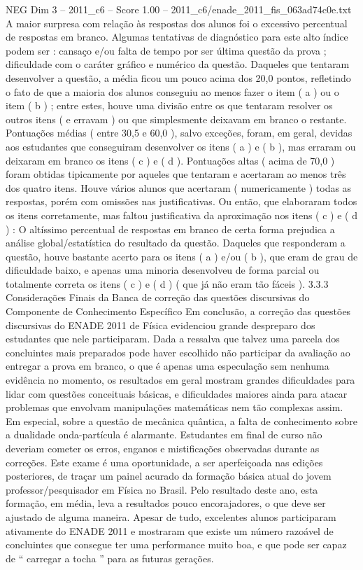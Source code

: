 \begin{textsample}{NEG Dim 3 – 2011\_c6 – Score 1.00 – 2011\_c6/enade\_2011\_fis\_063ad74c0e.txt}
A maior surpresa com relação às respostas dos alunos foi o excessivo percentual de respostas em branco.
Algumas tentativas de diagnóstico para este alto índice podem ser : cansaço e/ou falta de tempo por ser última questão da prova ; dificuldade com o caráter gráfico e numérico da questão.
Daqueles que tentaram desenvolver a questão, a média ficou um pouco acima dos 20,0 pontos, refletindo o fato de que a maioria dos alunos conseguiu ao menos fazer o item ( a ) ou o item ( b ) ; entre estes, houve uma divisão entre os que tentaram resolver os outros itens ( e erravam ) ou que simplesmente deixavam em branco o restante.
Pontuações médias ( entre 30,5 e 60,0 ), salvo exceções, foram, em geral, devidas aos estudantes que conseguiram desenvolver os itens ( a ) e ( b ), mas erraram ou deixaram em branco os itens ( c ) e ( d ).
Pontuações altas ( acima de 70,0 ) foram obtidas tipicamente por aqueles que tentaram e acertaram ao menos três dos quatro itens.
Houve vários alunos que acertaram ( numericamente ) todas as respostas, porém com omissões nas justificativas.
Ou então, que elaboraram todos os itens corretamente, mas faltou justificativa da aproximação nos itens ( c ) e ( d ) : O altíssimo percentual de respostas em branco de certa forma prejudica a análise global/estatística do resultado da questão.
Daqueles que responderam a questão, houve bastante acerto para os itens ( a ) e/ou ( b ), que eram de grau de dificuldade baixo, e apenas uma minoria desenvolveu de forma parcial ou totalmente correta os itens ( c ) e ( d ) ( que já não eram tão fáceis ). 3.3.3 Considerações Finais da Banca de correção das questões discursivas do Componente de Conhecimento Específico Em conclusão, a correção das questões discursivas do ENADE 2011 de Física evidenciou grande despreparo dos estudantes que nele participaram.
Dada a ressalva que talvez uma parcela dos concluintes mais preparados pode haver escolhido não participar da avaliação ao entregar a prova em branco, o que é apenas uma especulação sem nenhuma evidência no momento, os resultados em geral mostram grandes dificuldades para lidar com questões conceituais básicas, e dificuldades maiores ainda para atacar problemas que envolvam manipulações matemáticas nem tão complexas assim.
Em especial, sobre a questão de mecânica quântica, a falta de conhecimento sobre a dualidade onda-partícula é alarmante.
Estudantes em final de curso não deveriam cometer os erros, enganos e mistificações observadas durante as correções.
Este exame é uma oportunidade, a ser aperfeiçoada nas edições posteriores, de traçar um painel acurado da formação básica atual do jovem professor/pesquisador em Física no Brasil.
Pelo resultado deste ano, esta formação, em média, leva a resultados pouco encorajadores, o que deve ser ajustado de alguma maneira.
Apesar de tudo, excelentes alunos participaram ativamente do ENADE 2011 e mostraram que existe um número razoável de concluintes que consegue ter uma performance muito boa, e que pode ser capaz de “ carregar a tocha ” para as futuras gerações.

\end{textsample}
